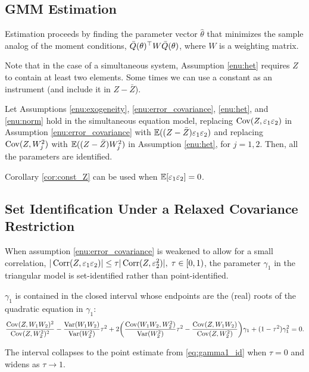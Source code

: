\subsection{GMM Estimation}
Estimation proceeds by finding the parameter vector $\hat{\theta}$ that minimizes
the sample analog of the moment conditions, $\bar{Q}(\theta)^{\top} W\bar{Q}(\theta)$,
where $W$ is a weighting matrix.

Note that in the case of a simultaneous system, Assumption \ref{enu:het} requires $Z$ to
contain at least two elements. Some times we can use a constant as
an instrument (and include it in $Z-\bar{Z}$).
\begin{cor}
\label{cor:const_Z}Let Assumptions \ref{enu:exogeneity}, \ref{enu:error_covariance},
\ref{enu:het}, and \ref{enu:norm} hold in the simultaneous equation
model, replacing $\operatorname{Cov}(Z,\varepsilon_{1}\varepsilon_{2})$
in Assumption \ref{enu:error_covariance} with $\mathbb{E}((Z-\bar{Z})\varepsilon_{1}\varepsilon_{2})$
and replacing $\operatorname{Cov}(Z,W_{j}^{2})$ with $\mathbb{E}((Z-\bar{Z})W_{j}^{2})$
in Assumption \ref{enu:het}, for $j=1,2$. Then, all the parameters
are identified.
\end{cor}

Corollary \ref{cor:const_Z} can be used when $\mathbb{E}[\varepsilon_{1}\varepsilon_{2}]=0$.

\subsection{Set Identification Under a Relaxed Covariance Restriction}

When assumption \ref{enu:error_covariance} is weakened to allow for
a small correlation, $|\operatorname{Corr}(Z,\varepsilon_{1}\varepsilon_{2})|\le\tau|\operatorname{Corr}(Z,\varepsilon_{2}^{2})|,\;\tau\in[0,1)$,
the parameter $\gamma_{1}$ in the triangular model is set-identified
rather than point-identified.

\begin{theorem} \label{thm:bounds}
$\gamma_{1}$ is contained in the closed interval whose endpoints
are the (real) roots of the quadratic equation in $\gamma_{1}$:
\[
\frac{\operatorname{Cov}(Z,W_{1}W_{2})^{2}}{\operatorname{Cov}(Z,W_{2}^{2})^{2}}-\frac{\operatorname{Var}(W_{1}W_{2})}{\operatorname{Var}(W_{2}^{2})}\tau^{2}+2\!\left(\frac{\operatorname{Cov}(W_{1}W_{2},W_{2}^{2})}{\operatorname{Var}(W_{2}^{2})}\tau^{2}-\frac{\operatorname{Cov}(Z,W_{1}W_{2})}{\operatorname{Cov}(Z,W_{2}^{2})}\right)\!\gamma_{1}+(1-\tau^{2})\gamma_{1}^{2}=0.
\]
\end{theorem} The interval collapses to the point estimate from \eqref{eq:gamma1_id}
when $\tau=0$ and widens as $\tau\to1$.

